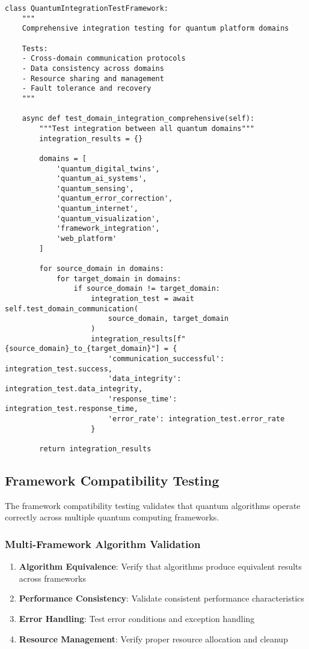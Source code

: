 \documentclass[12pt,a4paper]{report}
\begin{document}
\begin{lstlisting}
class QuantumIntegrationTestFramework:
    """
    Comprehensive integration testing for quantum platform domains

    Tests:
    - Cross-domain communication protocols
    - Data consistency across domains
    - Resource sharing and management
    - Fault tolerance and recovery
    """

    async def test_domain_integration_comprehensive(self):
        """Test integration between all quantum domains"""
        integration_results = {}

        domains = [
            'quantum_digital_twins',
            'quantum_ai_systems',
            'quantum_sensing',
            'quantum_error_correction',
            'quantum_internet',
            'quantum_visualization',
            'framework_integration',
            'web_platform'
        ]

        for source_domain in domains:
            for target_domain in domains:
                if source_domain != target_domain:
                    integration_test = await self.test_domain_communication(
                        source_domain, target_domain
                    )
                    integration_results[f"{source_domain}_to_{target_domain}"] = {
                        'communication_successful': integration_test.success,
                        'data_integrity': integration_test.data_integrity,
                        'response_time': integration_test.response_time,
                        'error_rate': integration_test.error_rate
                    }

        return integration_results
\end{lstlisting}

\subsection{Framework Compatibility Testing}

The framework compatibility testing validates that quantum algorithms operate correctly across multiple quantum computing frameworks.

\subsubsection{Multi-Framework Algorithm Validation}

\begin{enumerate}
\item \textbf{Algorithm Equivalence}: Verify that algorithms produce equivalent results across frameworks
\item \textbf{Performance Consistency}: Validate consistent performance characteristics
\item \textbf{Error Handling}: Test error conditions and exception handling
\item \textbf{Resource Management}: Verify proper resource allocation and cleanup
\end{enumerate}
\end{document}
